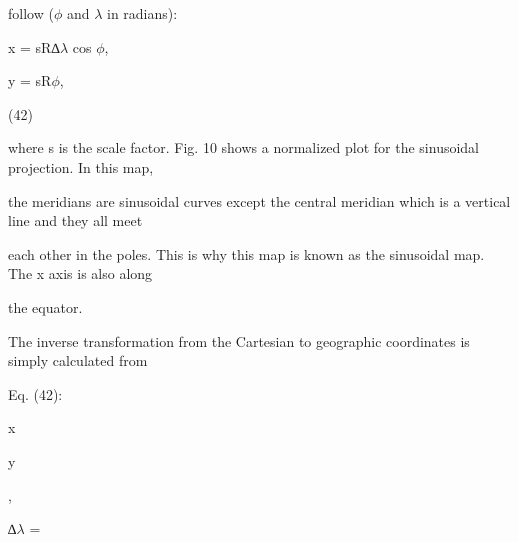 \documentclass[a4paper,portrait,12pt]{article}
\begin{document}
\begin{flushleft}
follow ($\phi$ and $\lambda$ in radians):
\end{flushleft}


\begin{flushleft}
x = sR∆$\lambda$ cos $\phi$,
\end{flushleft}





\begin{flushleft}
y = sR$\phi$,
\end{flushleft}





(42)





\begin{flushleft}
where s is the scale factor. Fig. 10 shows a normalized plot for the sinusoidal projection. In this map,
\end{flushleft}


\begin{flushleft}
the meridians are sinusoidal curves except the central meridian which is a vertical line and they all meet
\end{flushleft}


\begin{flushleft}
each other in the poles. This is why this map is known as the sinusoidal map. The x axis is also along
\end{flushleft}


\begin{flushleft}
the equator.
\end{flushleft}


\begin{flushleft}
The inverse transformation from the Cartesian to geographic coordinates is simply calculated from
\end{flushleft}


\begin{flushleft}
Eq. (42):
\end{flushleft}


\begin{flushleft}
x
\end{flushleft}


\begin{flushleft}
y
\end{flushleft}


,


\begin{flushleft}
∆$\lambda$ =
\end{flushleft}
\end{document}
